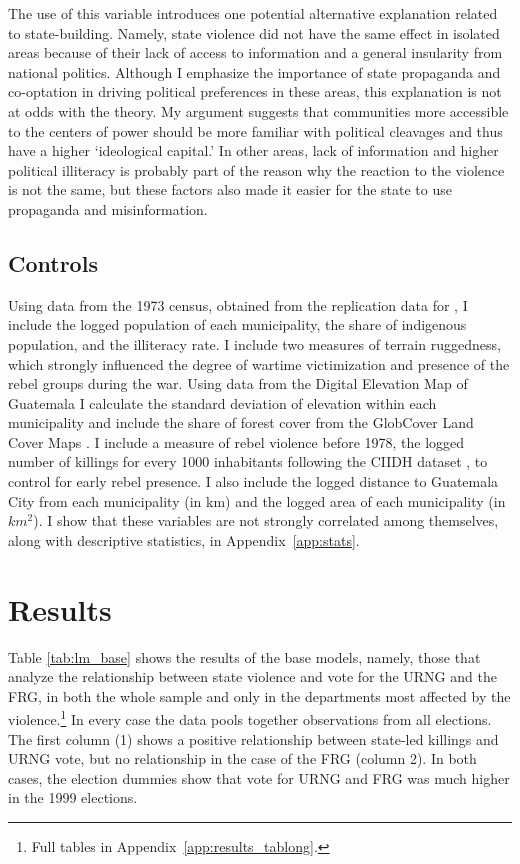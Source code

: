 \documentclass[12pt, notitlepage]{article}
\begin{document}
The use of this variable introduces one potential alternative explanation related to state-building.
Namely, state violence did not have the same effect in isolated areas because of their lack of access to information and a general insularity from national politics.
Although I emphasize the importance of state propaganda and co-optation in driving political preferences in these areas, this explanation is not at odds with the theory.
My argument suggests that communities more accessible to the centers of power should be more familiar with political cleavages and thus have a higher `ideological capital.'
In other areas, lack of information and higher political illiteracy is probably part of the reason why the reaction to the violence is not the same, but these factors also made it easier for the state to use propaganda and misinformation.

\subsection*{Controls}

Using data from the 1973 census, obtained from the replication data for \citet{Sullivan:2012aa}, I include the logged population of each municipality, the share of indigenous population, and the illiteracy rate.
I include two measures of terrain ruggedness, which strongly influenced the degree of wartime victimization and presence of the rebel groups during the war.
Using data from the Digital Elevation Map of Guatemala \citep{Mapzen:2018aa} I calculate the standard deviation of elevation within each municipality and include the share of forest cover from the GlobCover Land Cover Maps \citep{Arino:2012aa}.
I include a measure of rebel violence before 1978, the logged number of killings for every 1000 inhabitants following the CIIDH dataset \citep{Ball:1999aa}, to control for early rebel presence.
I also include the logged distance to Guatemala City from each municipality (in km) and the logged area of each municipality (in $km^2$).
I show that these variables are not strongly correlated among themselves, along with descriptive statistics, in Appendix~\ref{app:stats}.

\section*{Results}

Table \ref{tab:lm_base} shows the results of the base models, namely, those that analyze the relationship between state violence and vote for the URNG and the FRG, in both the whole sample and only in the departments most affected by the violence.\footnote{Full tables in Appendix~\ref{app:results_tablong}.}
In every case the data pools together observations from all elections.
The first column (1) shows a positive relationship between state-led killings and URNG vote, but no relationship in the case of the FRG (column 2).
In both cases, the election dummies show that vote for URNG and FRG was much higher in the 1999 elections.
\end{document}
